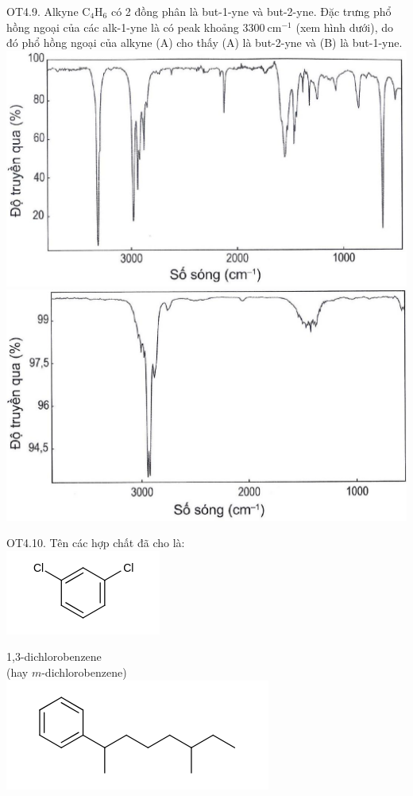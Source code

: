 \documentclass[10pt]{article}
\begin{document}
OT4.9. Alkyne $\mathrm{C}_{4} \mathrm{H}_{6}$ có 2 đồng phân là but-1-yne và but-2-yne. Đặc trưng phổ hồng ngoại của các alk-1-yne là có peak khoảng $3300 \mathrm{~cm}^{-1}$ (xem hình dưới), do đó phổ hồng ngoại của alkyne (A) cho thấy (A) là but-2-yne và (B) là but-1-yne.\\
\includegraphics[max width=\textwidth, center]{2025_10_23_adad5b98d65ac6665838g-29(1)}\\
\includegraphics[max width=\textwidth, center]{2025_10_23_adad5b98d65ac6665838g-29}

OT4.10. Tên các hợp chất đã cho là:\\
\includegraphics{smile-09fe149c5c44110826675d0a11d7a8f063481cb8}

1,3-dichlorobenzene\\
(hay $m$-dichlorobenzene)\\
\includegraphics{smile-5320ab1bd2a8cd780de0628e72d63f8b48a85a39}
\end{document}
